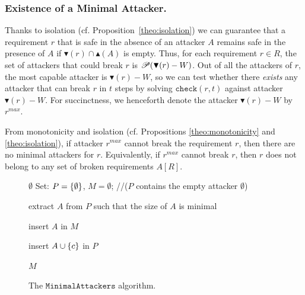 {\subsubsection{Existence of a Minimal Attacker.} Thanks to isolation (cf. Proposition~\ref{theo:isolation}) we can guarantee that a requirement $r$ that is safe in the absence of an attacker $A$ remains safe in the presence of $A$ if $\blacktriangledown(r) \cap \blacktriangle(A)$ is empty. Thus, for each requirement $r\in R$, the set of attackers that could break $r$ is ${{\mathscr{P}}\!\left({\blacktriangledown(r)-W}\right)}$. Out of all the attackers of $r$, the most capable attacker is $\blacktriangledown(r)-W$, so we can test whether there \emph{exists} any attacker that can break $r$ in $t$ steps by solving $\mathtt{check}(r,t)$ against attacker $\blacktriangledown(r)-W$. 
For succinctness, we henceforth denote the attacker $\blacktriangledown(r)-W$ by $r^{max}$.
\begin{corollary}
From monotonicity and isolation (cf. Propositions \ref{theo:monotonicity} and \ref{theo:isolation}), if attacker $r^{max}$ cannot break the requirement $r$, then there are no minimal attackers for $r$. Equivalently, if $r^{max}$ cannot break $r$, then $r$ does not belong to any set of broken requirements $A[R]$.
\end{corollary}
\begin{figure}[!h]
\centering
{
\begin{algorithm}[H]
{
	{	
		\Return $\emptyset$\;
	}
}
Set: $P=\left\{\emptyset\right\}$, $M= \emptyset$; \quad /\!/($P$ contains the empty attacker $\emptyset$)\\
{
	extract $A$ from $P$ such that the size of $A$ is minimal\;
	{	
        	{
        		insert $A$ in $M$\;
        	}
        	{
        		 {
        			insert $A \cup \left\{c\right\}$ in $P$\;
        	 	}
        
        	}
	}
	
}
\Return $M$\;

 \caption{The $\mathtt{MinimalAttackers}$ algorithm.}
 \label{alg:CheckRequirement}
\end{algorithm}
}
\vspace{-0.5cm}
\end{figure}
}
